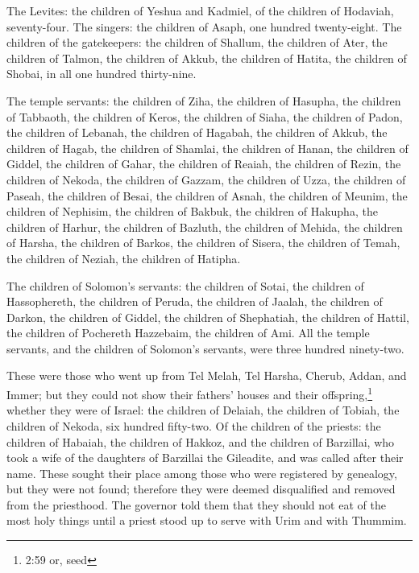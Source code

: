 \myverse{}The Levites: the children of Yeshua and Kadmiel, of the children
of Hodaviah, seventy-four.
\myverse{}The singers: the children of Asaph, one hundred twenty-eight.
\myverse{}The children of the gatekeepers: the children of Shallum, the children of
Ater, the children of Talmon, the children of Akkub, the children of Hatita, the children of Shobai, in
all one hundred thirty-nine.

\myverse{}The temple servants: the children of Ziha, the children of Hasupha,
the children of Tabbaoth,
\myverse{}the children of Keros, the children of Siaha, the children of Padon,
\myverse{}the children of Lebanah, the children of Hagabah, the children of Akkub,
\myverse{}the children of Hagab, the children of Shamlai, the children of Hanan,
\myverse{}the children of Giddel, the children of Gahar, the children of Reaiah,
\myverse{}the children of Rezin, the children of Nekoda, the children of Gazzam,
\myverse{}the children of Uzza, the children of Paseah, the children of Besai,
\myverse{}the children of Asnah, the children of Meunim, the children of Nephisim,
\myverse{}the children of Bakbuk, the children of Hakupha, the children of Harhur,
\myverse{}the children of Bazluth, the children of Mehida, the children of Harsha,
\myverse{}the children of Barkos, the children of Sisera, the children of Temah,
\myverse{}the children of Neziah, the children of Hatipha.

\myverse{}The children of Solomon’s servants: the children of Sotai, the
children of Hassophereth, the children of Peruda,
\myverse{}the children of Jaalah, the children of Darkon, the children of Giddel,
\myverse{}the children of Shephatiah, the children of Hattil, the children of Pochereth
Hazzebaim, the children of Ami.
\myverse{}All the temple servants, and the children of Solomon’s servants, were three
hundred ninety-two.

\myverse{}These were those who went up from Tel Melah, Tel Harsha, Cherub,
Addan, and Immer; but they could not show their fathers’ houses and their offspring,\footnote{2:59 or, seed} whether they were of Israel:
\myverse{}the children of Delaiah, the children of Tobiah, the children of Nekoda, six
hundred fifty-two.
\myverse{}Of the children of the priests: the children of Habaiah, the children of Hakkoz,
and the children of Barzillai, who took a wife of the daughters of Barzillai the Gileadite, and was called
after their name.
\myverse{}These sought their place among those who were registered by genealogy, but
they were not found; therefore they were deemed disqualified and removed from the priesthood.
\myverse{}The governor told them that they should not eat of the most holy things until
a priest stood up to serve with Urim and with Thummim.

